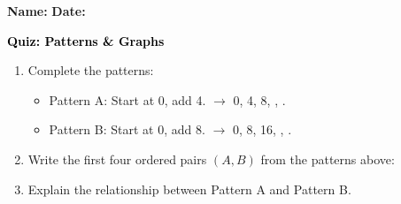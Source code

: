 \documentclass[12pt, letterpaper, fleqn]{article}
\newcommand{\blank}{\underline{\hspace{2.2cm}}}
\newcommand{\blanklong}{\underline{\hspace{6.5cm}}}
\begin{document}
\textbf{Name:} \underline{\hspace{5cm}}
\hfill
\textbf{Date:} \underline{\hspace{3cm}}\\

\begin{tcolorbox}[colback=customteal!20]
    \large\textcolor{black}{\textbf{Quiz: Patterns \& Graphs}}
\end{tcolorbox}
\begin{enumerate}[itemsep=3.5cm, leftmargin=0.6cm]
\item Complete the patterns:
  \begin{itemize}
    \item Pattern A: Start at 0, add 4. $\rightarrow$ 0, 4, 8, \blank, \blank.
    \item Pattern B: Start at 0, add 8. $\rightarrow$ 0, 8, 16, \blank, \blank.
  \end{itemize}
\item Write the first four ordered pairs $(A, B)$ from the patterns above:
\\
\blanklong
\item Explain the relationship between Pattern A and Pattern B.
\end{enumerate}
\end{document}
